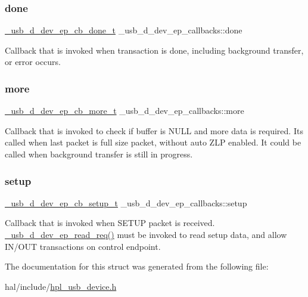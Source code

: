 \subsubsection{\texorpdfstring{done}{done}}
{\footnotesize\ttfamily \hyperlink{hpl__usb__device_8h_a60aa954de0dd8fc6dfd175699d8d7165}{\+\_\+usb\+\_\+d\+\_\+dev\+\_\+ep\+\_\+cb\+\_\+done\+\_\+t} \+\_\+usb\+\_\+d\+\_\+dev\+\_\+ep\+\_\+callbacks\+::done}

Callback that is invoked when transaction is done, including background transfer, or error occurs. \mbox{\label{struct__usb__d__dev__ep__callbacks_afec5f7edef6aba004bb3950d733c028f}} 
\subsubsection{\texorpdfstring{more}{more}}
{\footnotesize\ttfamily \hyperlink{hpl__usb__device_8h_a659f0292117e58db11a03eda4c363fcb}{\+\_\+usb\+\_\+d\+\_\+dev\+\_\+ep\+\_\+cb\+\_\+more\+\_\+t} \+\_\+usb\+\_\+d\+\_\+dev\+\_\+ep\+\_\+callbacks\+::more}

Callback that is invoked to check if buffer is N\+U\+LL and more data is required. It\textquotesingle{}s called when last packet is full size packet, without auto Z\+LP enabled. It could be called when background transfer is still in progress. \mbox{\label{struct__usb__d__dev__ep__callbacks_adbbe0ff2f92220167cc1aab7585e1abc}} 
\subsubsection{\texorpdfstring{setup}{setup}}
{\footnotesize\ttfamily \hyperlink{hpl__usb__device_8h_a81bbff71ce31abdbe92373eed18b1b92}{\+\_\+usb\+\_\+d\+\_\+dev\+\_\+ep\+\_\+cb\+\_\+setup\+\_\+t} \+\_\+usb\+\_\+d\+\_\+dev\+\_\+ep\+\_\+callbacks\+::setup}

Callback that is invoked when S\+E\+T\+UP packet is received. \hyperlink{hpl__usb__device_8h_a986e37ddeda86792722e0bc8aac155bf}{\+\_\+usb\+\_\+d\+\_\+dev\+\_\+ep\+\_\+read\+\_\+req()} must be invoked to read setup data, and allow I\+N/\+O\+UT transactions on control endpoint. 

The documentation for this struct was generated from the following file\+:\begin{DoxyCompactItemize}
\item 
hal/include/\hyperlink{hpl__usb__device_8h}{hpl\+\_\+usb\+\_\+device.\+h}\end{DoxyCompactItemize}
